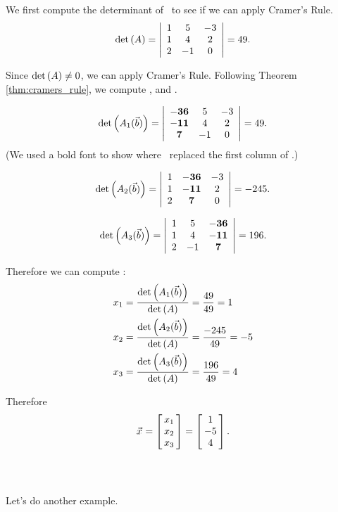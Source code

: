 {We first compute the determinant of \tta\ to see if we can apply Cramer's Rule. $$\det{\tta} = \bdt{ccc}1&5&-3\\1&4&2\\2&-1&0\edt = 49.$$

Since $\det{\tta}\neq 0$, we can apply Cramer's Rule. Following Theorem \ref{thm:cramers_rule}, we compute ,  and . 

$$\det{\tta_1(\vb)} = \bdt{ccc} {\bf -36}&5&-3\\{\bf -11}&4&2\\{\bf 7}&-1&0 \edt = 49.$$
(We used a bold font to show where \vb\ replaced the first column of \tta.)

$$\det{\tta_2(\vb)} = \bdt{ccc} 1&{\bf -36}&-3\\1&{\bf -11}&2\\2&{\bf 7}&0\edt = -245.$$

$$\det{\tta_3(\vb)} = \bdt{ccc}  1&5&{\bf -36}\\1&4&{\bf -11}\\2&-1&{\bf 7}\edt = 196.$$

Therefore we can compute \vx:
\begin{align*}
x_1 &= \frac{\det{\tta_1(\vb)}}{\det{\tta}} = \frac{49}{49} = 1\\
x_2 &= \frac{\det{\tta_2(\vb)}}{\det{\tta}} = \frac{-245}{49} = -5\\
x_3 &= \frac{\det{\tta_3(\vb)}}{\det{\tta}} = \frac{196}{49} = 4
\end{align*}

Therefore $$\vx = \bmx{c}x_1\\x_2\\x_3\emx = \bmx{c}1\\-5\\4\emx.$$
\ } \\ %

Let's do another example.\\

